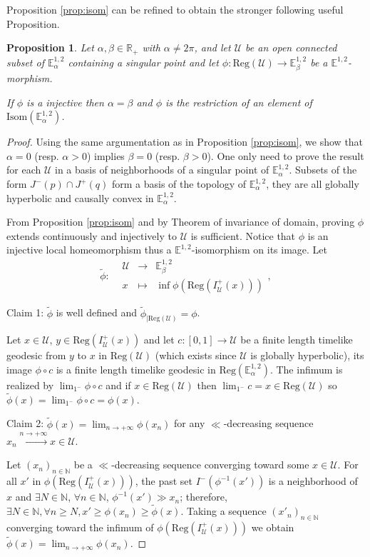 \documentclass[a4paper,12pt]{article}
\def\U{\mathcal U}
\def\isom{Isom}
\def\R{\mathbb{R}}
\def\E{\mathbf E}
\def\N{\mathbb N}
\def\E{\mathbb{E}}
\newcommand{\mass}[1]{{\mathbb E}^{1,2}_{#1}}
\def\isom{\mathrm{Isom}}
\def\Reg{\mathrm{Reg}}
\def\reg{\Reg}
\newcommand{\fonction}[5]{\displaystyle#1:\begin{array}{l|rcl}
& \displaystyle #2 & \longrightarrow & \displaystyle #3 \\
    & \displaystyle #4 & \longmapsto & \displaystyle #5 \end{array}}
\newtheorem{propou}[lemou]{Proposition}
\begin{document}
Proposition \ref{prop:isom} can be refined to obtain the stronger following useful Proposition.
\begin{propou}\label{prop:isom_strong}
Let $\alpha,\beta\in \R_+$  with $\alpha\neq 2\pi$, and let $\U$ be an open connected
	  subset of $\E^{1,2}_\alpha$ containing a singular point
	  and let $\phi:\reg(\U)\rightarrow \E^{1,2}_\beta$ be a $\mass{}$-morphism. 
	  
	 If $\phi$ is a injective then $\alpha=\beta$ and  
	  $\phi$ is the restriction of an element of $\isom(\E^{1,2}_\alpha)$. 
\end{propou}


\begin{proof} Using the same argumentation as in Proposition \ref{prop:isom}, we show that $\alpha=0$ (resp. $\alpha>0$) implies $\beta=0$ (resp. $\beta>0$). One only need to prove the result for each $\U$ in a basis of neighborhoods of a singular point of $\mass{\alpha}$. Subsets of the form $J^-(p)\cap J^+(q)$ form a basis of the topology of $\mass{\alpha}$, they are all globally hyperbolic and causally convex in $\mass{\alpha}$. 

From Proposition \ref{prop:isom} and by Theorem of invariance of domain, proving $\phi$ extends continuously and injectively to $\U$ is sufficient. 
Notice that $\phi$ is an injective local homeomorphism thus a $\mass{}$-isomorphism on its image.
Let  $$\fonction{\widetilde \phi}{\U}{\mass{\beta}}{x}{\inf \phi(\Reg(I^+_\U(x)))},$$
\item Claim 1: $\widetilde \phi$ is well defined and $\widetilde \phi_{|\Reg(\U)} = \phi$. 

Let $x\in \U$, $y \in \Reg(I^+_\U(x))$ and let $c: [0,1]\rightarrow \U$ be a finite length timelike geodesic from $y$ to $x$ in $\Reg(\U)$ (which exists since $\U$ is globally hyperbolic), its image $\phi\circ c$ is a finite length timelike geodesic in $\Reg(\mass{\alpha})$. The infimum is realized by $\lim_{1^-}\phi\circ c$ and if $x\in \Reg(\U)$ then $\lim_{1^-} c = x\in \Reg(\U)$ so  $\widetilde \phi(x)=\lim_{1^-}\phi\circ c = \phi(x)$.

\item  Claim 2: $\displaystyle \widetilde \phi(x) = \lim_{n\rightarrow +\infty} \phi(x_n)$ for any $\ll$-decreasing sequence $x_n\xrightarrow{n\rightarrow +\infty}x\in \U$.

Let $(x_n)_{n\in\N}$ be a $\ll$-decreasing sequence converging toward some $x\in \U$.  For all $x'$ in $\phi(\Reg(I^+_\U(x)))$, the past set $I^-(\phi^{-1}(x'))$ is a neighborhood of $x$ and $\exists N\in \N$,  $\forall n\in \N$, $\phi^{-1}(x')\gg x_n$; therefore,  $\exists N\in \N,\forall n\geq N,x'\geq \phi(x_n)\geq \widetilde \phi(x)$. Taking a sequence $(x'_n)_{n\in\N}$ converging toward the infimum of $\phi(\Reg(I^+_\U(x)))$ we obtain $\widetilde \phi(x) = \lim_{n\rightarrow +\infty} \phi(x_n)$.


\end{proof}
\end{document}
